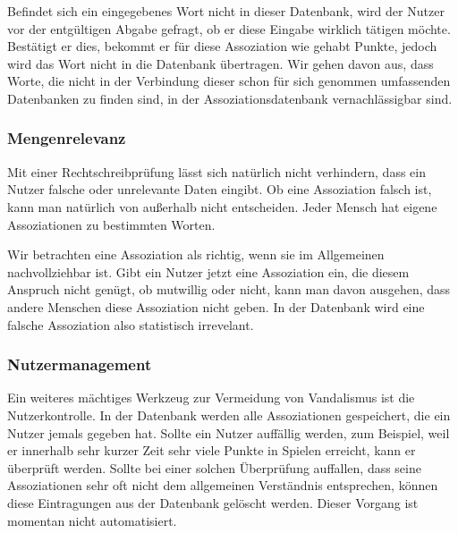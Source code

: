 Befindet sich ein eingegebenes Wort nicht in dieser Datenbank, wird der Nutzer
vor der entgültigen Abgabe gefragt, ob er diese Eingabe wirklich tätigen
möchte. Bestätigt er dies, bekommt er für diese Assoziation wie gehabt Punkte,
jedoch wird das Wort nicht in die Datenbank übertragen. Wir gehen davon aus,
dass Worte, die nicht in der Verbindung dieser schon für sich genommen
umfassenden Datenbanken zu finden sind, in der Assoziationsdatenbank
vernachlässigbar sind.


\subsubsection{Mengenrelevanz}
Mit einer Rechtschreibprüfung lässt sich natürlich nicht verhindern, dass ein
Nutzer falsche oder unrelevante Daten eingibt. Ob eine Assoziation falsch ist,
kann man natürlich von außerhalb nicht entscheiden. Jeder Mensch hat eigene
Assoziationen zu bestimmten Worten.

Wir betrachten eine Assoziation als richtig, wenn sie im Allgemeinen
nachvollziehbar ist. Gibt ein Nutzer jetzt eine Assoziation ein, die diesem
Anspruch nicht genügt, ob mutwillig oder nicht, kann man davon ausgehen, dass
andere Menschen diese Assoziation nicht geben. In der Datenbank wird eine
falsche Assoziation also statistisch irrevelant.

\subsubsection{Nutzermanagement}
Ein weiteres mächtiges Werkzeug zur Vermeidung von Vandalismus ist die
Nutzerkontrolle. In der Datenbank werden alle Assoziationen gespeichert, die
ein Nutzer jemals gegeben hat. Sollte ein Nutzer auffällig werden, zum
Beispiel, weil er innerhalb sehr kurzer Zeit sehr viele Punkte in Spielen
erreicht, kann er überprüft werden. Sollte bei einer solchen Überprüfung
auffallen, dass seine Assoziationen sehr oft nicht dem allgemeinen Verständnis
entsprechen, können diese Eintragungen aus der Datenbank gelöscht werden.
Dieser Vorgang ist momentan nicht automatisiert.
